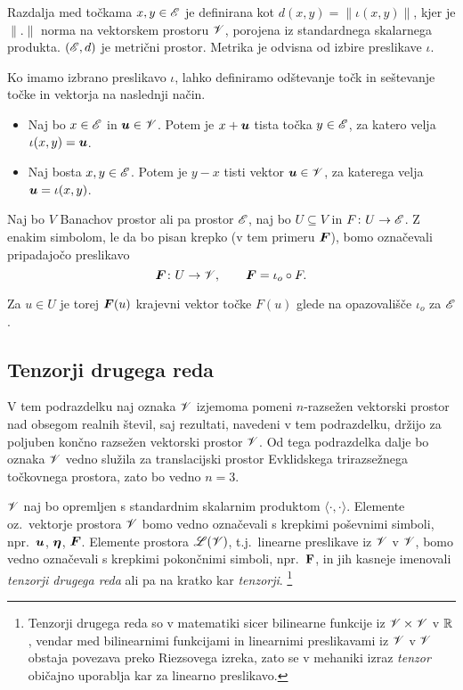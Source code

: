 Razdalja med točkama $x,y\in\mathscr E$ je definirana kot $d(x,y)=\|\iota(x,y)\|$, kjer je $\|.\|$ norma na
vektorskem prostoru $\mathscr V$, porojena iz standardnega skalarnega produkta. $(\mathscr E,d)$ je metrični prostor.
Metrika je odvisna od izbire preslikave $\iota$.

Ko imamo izbrano preslikavo $\iota$, lahko definiramo odštevanje točk in sešte\-vanje točke in vektorja
na naslednji način.
\begin{itemize}
	\item Naj bo $x\in\mathscr E$ in $\boldsymbol u\in\mathscr V$. Potem je $x+\boldsymbol u$ tista točka $y\in\mathscr E$, za
	katero velja $\iota(x,y)=\boldsymbol u$.
	\item Naj bosta $x,y\in\mathscr E$. Potem je $y-x$ tisti vektor $\boldsymbol u\in\mathscr V$, za katerega
	velja $\boldsymbol u=\iota(x,y)$.
\end{itemize}

\begin{dogovor} \label{d:dogovor}
	Naj bo $V$ Banachov prostor ali pa prostor $\mathscr E$, naj bo $U\subseteq V$ in
	$F\colon U\to \mathscr E$. Z enakim simbolom, le da bo pisan krepko (v tem primeru $\boldsymbol F$),
	bomo označevali pripadajočo preslikavo
	\[
		\boldsymbol F\colon U\to\mathscr V,\qquad \boldsymbol F=\iota_o\circ F.
	\]
\end{dogovor}
Za $u\in U$ je torej $\boldsymbol F(u)$ krajevni vektor točke $F(u)$ glede na opazovališče $\iota_o$ za $\mathscr E$.


\subsection{Tenzorji drugega reda} \label{pdrten2}


V tem podrazdelku naj oznaka $\mathscr V$ izjemoma pomeni $n$-razsežen vektorski prostor nad
obsegom realnih števil, saj rezultati, navedeni v tem podrazdelku, držijo za poljuben
končno razsežen vektorski prostor $\mathscr V$. Od tega podrazdelka dalje bo oznaka $\mathscr V$ vedno
služila za translacijski prostor Evklidskega trirazsežnega točkovnega prostora, zato bo vedno $n=3$.

$\mathscr V$ naj bo opremljen s standardnim skalarnim produktom $\langle\cdot,\cdot\rangle$.
Elemente oz.~vektorje prostora $\mathscr V$ bomo vedno označevali s krepkimi poševni\-mi simboli,
npr.~$\boldsymbol u$, $\boldsymbol \eta$, $\boldsymbol F$. Elemente prostora $\mathscr L(\mathscr V)$, t.j.~linearne
preslikave iz $\mathscr V$ v $\mathscr V$, bomo vedno označevali s krepkimi pokončnimi simboli, npr.~$\mathbf F$,
in jih kasneje imenovali \emph{tenzorji drugega reda} ali pa na kratko kar \emph{tenzorji}.
\footnote{Tenzorji drugega reda so v matematiki sicer bilinearne funkcije iz $\mathscr V\times\mathscr V$ v $\mathbb R$, vendar med 
bilinearnimi funkcijami in linearnimi preslikavami iz $\mathscr V$ v $\mathscr V$
obstaja povezava preko Riezsovega izreka, zato se v mehaniki
izraz \textit{tenzor} običajno uporablja kar za linearno preslikavo.}

